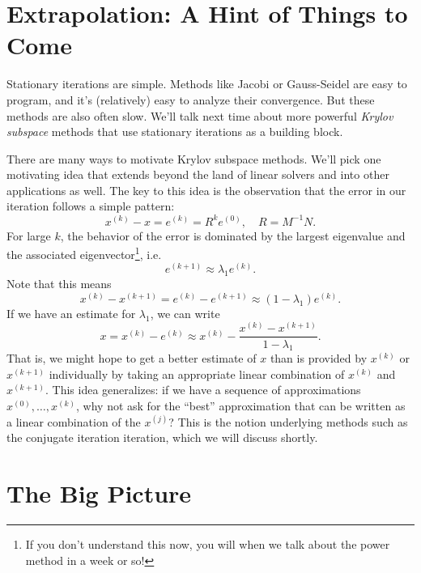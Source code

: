 \documentclass[12pt, leqno]{article}
\begin{document}
\section*{Extrapolation: A Hint of Things to Come}

Stationary iterations are simple.  Methods like Jacobi or Gauss-Seidel
are easy to program, and it's (relatively) easy to analyze their
convergence.  But these methods are also often slow.  We'll talk next
time about more powerful {\em Krylov subspace} methods that use
stationary iterations as a building block.

There are many ways to motivate Krylov subspace methods.  We'll 
pick one motivating idea that extends beyond
the land of linear solvers and into other applications as well.
The key to this idea is the observation that the error in our
iteration follows a simple pattern:
\[
  x^{(k)}-x = e^{(k)} = R^k e^{(0)}, \quad R = M^{-1} N.
\]
For large $k$, the behavior of the error is dominated by the largest
eigenvalue and the associated eigenvector\footnote{%
If you don't understand this now, you will when we talk about the
power method in a week or so!}, i.e.
\[
  e^{(k+1)} \approx \lambda_1 e^{(k)}.
\]
Note that this means
\[
  x^{(k)}-x^{(k+1)} = e^{(k)}-e^{(k+1)} \approx (1-\lambda_1) e^{(k)}.
\]
If we have an estimate for $\lambda_1$, we can write
\[
  x = x^{(k)} - e^{(k)} \approx
  x^{(k)}-\frac{x^{(k)}-x^{(k+1)}}{1-\lambda_1}.
\]
That is, we might hope to get a better estimate of $x$ than is
provided by $x^{(k)}$ or $x^{(k+1)}$ individually by taking an
appropriate linear combination of $x^{(k)}$ and $x^{(k+1)}$.  This
idea generalizes: if we have a sequence of approximations
$x^{(0)}, \ldots, x^{(k)}$, why not ask for the ``best'' approximation
that can be written as a linear combination of the $x^{(j)}$?
This is the notion underlying methods such as the conjugate iteration
iteration, which we will discuss shortly.

\section*{The Big Picture}
\end{document}
